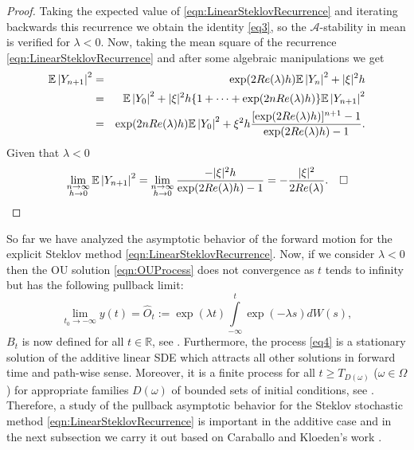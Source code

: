 	\begin{proof}  
		Taking the expected value of \eqref{eqn:LinearSteklovRecurrence} and iterating
		backwards this recurrence we obtain the identity \eqref{eq3}, so the
		$\mathcal{A}$-stability in mean is verified for $\lambda<0$. Now, taking the mean
		square of the recurrence \eqref{eqn:LinearSteklovRecurrence} and after some algebraic
		manipulations we get
		\begin{eqnarray*}\label{eqn:SteklovMS-Stable1}
			\mathbb{E}\left|Y_{n+1}\right|^2&
			=&\exp(2Re(\lambda)h)
				\mathbb{E}\left|Y_n\right|^2+|\xi|^2 h\\
			&=& 
				\mathbb{E}\left|Y_{0}\right|^2+|\xi|^2h
				\{1+\cdots+
				\exp(2n Re(\lambda) h)\}
				\mathbb{E}\left|Y_{n+1}\right|^2\\
			&=&
				\exp(2n Re(\lambda) h)
				\mathbb{E}\left|Y_0\right|^2
				+\xi^2 h
				\frac{[\exp(2Re(\lambda)h)]^{n+1}-1}{\exp(2Re(\lambda)h)-1}.
		\end{eqnarray*}
		Given that $\lambda<0$
		\begin{eqnarray*}
		\lim_{\substack{ n\to \infty\\ h\to 0}}
		\mathbb{E}\left|Y_{n+1}\right|^2=\lim_{\substack{ n\to \infty\\ h\to 0}}
		\frac{-|\xi|^2 h}{\exp(2Re(\lambda)h)-1}=
		-\frac{|\xi|^2}{2Re(\lambda)}.\quad \square
		\end{eqnarray*}
	\end{proof}
	So far we have analyzed  the asymptotic behavior of the forward motion for the explicit
	Steklov method  \eqref{eqn:LinearSteklovRecurrence}. Now, if we consider $\lambda<0$
	then the OU solution \eqref{eqn:OUProcess} does not convergence as $t$ tends to infinity
	but has the following pullback limit:
	\begin{equation}\label{eq4}
		\lim_{t_0\to-\infty} y(t)=\widehat{O}_t:=
		\exp(\lambda t)\int\limits_{-\infty}^{t}\exp(-\lambda s)dW(s), 
	\end{equation}
	$B_t$  is now defined for all $t\in\mathbb{R}$, see
	\cite{Arnold1998, kloeden1999towards}. Furthermore, the process \eqref{eq4} is a
	stationary solution  of the additive linear SDE which attracts all other solutions in
	forward time and path-wise sense. Moreover, it is a finite process for all $t\geq
	T_{D(\omega)}$ ($\omega\in \Omega$) for  appropriate families $D(\omega)$ of bounded
	sets of initial conditions, see \cite{Robinson2002}. Therefore, a study of the pullback
	asymptotic behavior for the Steklov stochastic method
	\eqref{eqn:LinearSteklovRecurrence} is important in the additive case and in the next
	subsection we carry it out based on Caraballo and Kloeden's work  \cite{Caraballo2006}.
